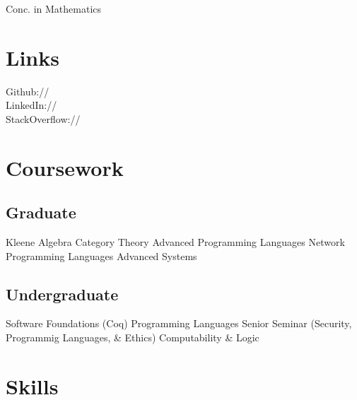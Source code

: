 \documentclass[]{deedy-resume-openfont}
\begin{document}
\begin{minipage}[t]{0.33\textwidth}


  Conc. in Mathematics
  \sectionsep





\section{Links} 
Github:// \href{https://github.com/ericthewry}{} \\
LinkedIn://  \href{https://www.linkedin.com/in/eric-campbell-ba339490/}{} \\
StackOverflow:// \href{https://stackoverflow.com/users/8202530/ericthewry}{}
\sectionsep


\section{Coursework}
\subsection{Graduate}
Kleene Algebra \textbullet{}
Category Theory \textbullet{}
Advanced Programming Languages \textbullet{}
Network Programming Languages \textbullet{}
Advanced Systems
\sectionsep

\subsection{Undergraduate}
Software Foundations (Coq) \textbullet{}
Programming Languages \textbullet{}
Senior Seminar (Security, Programmig Languages, \& Ethics) \textbullet{}
Computability \& Logic %
\sectionsep


\section{Skills}

\end{minipage}
\end{document}
